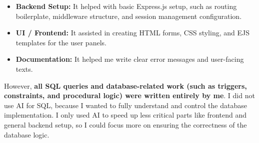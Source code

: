 \documentclass[12pt, a4paper]{article}
\begin{document}
    \begin{itemize}
        \item \textbf{Backend Setup:} It helped with basic Express.js setup, such as routing boilerplate, middleware structure, and session management configuration.
        
        \item \textbf{UI / Frontend:} It assisted in creating HTML forms, CSS styling, and EJS templates for the user panels.
        
        \item \textbf{Documentation:} It helped me write clear error messages and user-facing texts.
    \end{itemize}
    
    However, \textbf{all SQL queries and database-related work (such as triggers, constraints, and procedural logic) were written entirely by me}. I did not use AI for SQL, because I wanted to fully understand and control the database implementation. I only used AI to speed up less critical parts like frontend and general backend setup, so I could focus more on ensuring the correctness of the database logic.
    
    
\end{document}
